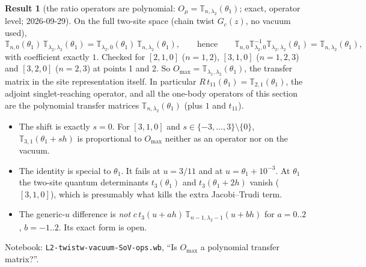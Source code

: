 \documentclass[11pt]{article}
\newcommand{\nb}[1]{\texttt{#1}}
\theoremstyle{definition}
\newtheorem{result}{Result}
\theoremstyle{remark}
\begin{document}
\begin{result}[{the ratio operators are polynomial: $O_\mu=\mathbb T_{n,\lambda_2}(\theta_1)$; exact, operator level; 2026-09-29}]
On the full two-site space (chain twist $G_c(z)$, no vacuum used),
\[
\mathbb T_{n,0}(\theta_1)\,\mathbb T_{\lambda_2,\lambda_2}(\theta_1)=\mathbb T_{\lambda_2,0}(\theta_1)\,\mathbb T_{n,\lambda_2}(\theta_1),
\qquad\text{hence}\qquad
\mathbb T_{n,0}\mathbb T_{\lambda_2,0}^{-1}\mathbb T_{\lambda_2,\lambda_2}(\theta_1)=\mathbb T_{n,\lambda_2}(\theta_1),
\]
with coefficient exactly $1$. Checked for $[2,1,0]$ ($n=1,2$), $[3,1,0]$ ($n=1,2,3$) and $[3,2,0]$ ($n=2,3$) at points 1 and 2. So $O_{\max}=\mathbb T_{\lambda_1,\lambda_2}(\theta_1)$, the transfer matrix in the site representation itself. In particular $R\,t_{11}(\theta_1)=\mathbb T_{2,1}(\theta_1)$, the adjoint singlet-reaching operator, and all the one-body operators of this section are the polynomial transfer matrices $\mathbb T_{n,\lambda_2}(\theta_1)$ (plus $1$ and $t_{11}$).
\begin{itemize}
\item The shift is exactly $s=0$. For $[3,1,0]$ and $s\in\{-3,\dots,3\}\setminus\{0\}$, $\mathbb T_{3,1}(\theta_1+sh)$ is proportional to $O_{\max}$ neither as an operator nor on the vacuum.
\item The identity is special to $\theta_1$. It fails at $u=3/11$ and at $u=\theta_1+10^{-3}$. At $\theta_1$ the two-site quantum determinants $t_3(\theta_1)$ and $t_3(\theta_1+2h)$ vanish ($[3,1,0]$), which is presumably what kills the extra Jacobi--Trudi term.
\item The generic-$u$ difference is \emph{not} $c\,t_3(u+ah)\,\mathbb T_{n-1,\lambda_2-1}(u+bh)$ for $a=0..2$, $b=-1..2$. Its exact form is open.
\end{itemize}
Notebook: \nb{L2-twistw-vacuum-SoV-ops.wb}, ``Is $O_{\max}$ a polynomial transfer matrix?''.
\end{result}
\end{document}
